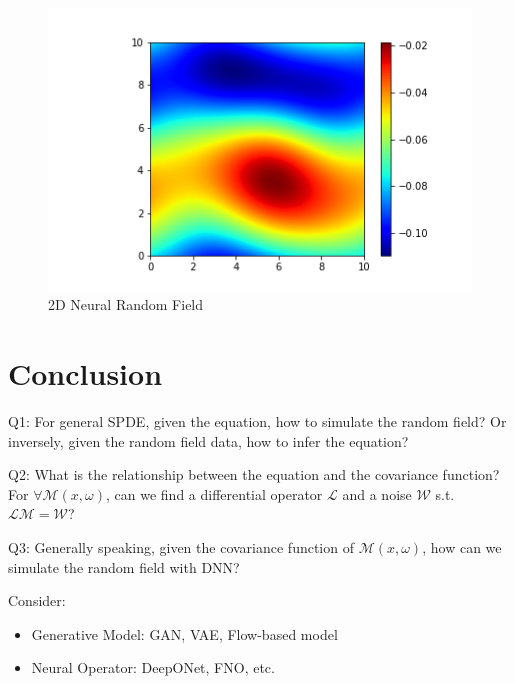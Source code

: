 \documentclass{article}
\begin{document}
\begin{figure}[H]
\begin{minipage}[t]{0.3\textwidth}
    \includegraphics[width=\textwidth]{./pics/2D_NeuralRF_256_10.0_10_1.png}  %
    \caption*{$\nu=10, \kappa=1$}
  \end{minipage}

    \caption{2D Neural Random Field}
    \label{2dnrf}
\end{figure}



\section{Conclusion}
Q1: For general SPDE, given the equation, how to simulate the random field? 
Or inversely, given the random field data, how to infer the equation?

Q2: What is the relationship between the equation and the covariance function? 
For $\forall \mathcal{M}(x, \omega)$, can we find a differential operator $\mathcal{L}$ and a noise $\mathcal{W}$ s.t. $\mathcal{L}\mathcal{M} =\mathcal{W}$?

Q3: Generally speaking, given the covariance function of $\mathcal{M}(x, \omega)$, 
how can we simulate the random field with DNN?

Consider:
\begin{itemize}
	\item Generative Model: GAN, VAE, Flow-based model
	\item Neural Operator: DeepONet, FNO, etc.
\end{itemize}

\newpage



\newpage
\appendix
\end{document}
